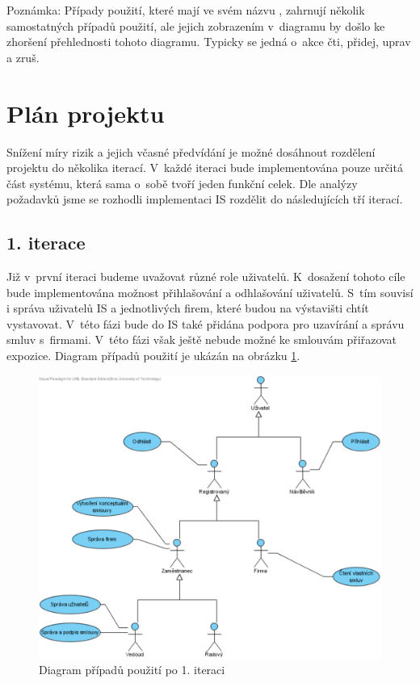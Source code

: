 Poznámka: Případy použití, které mají ve svém názvu , zahrnují
několik samostatných případů použití, ale jejich zobrazením v~diagramu by došlo
ke zhoršení přehlednosti tohoto diagramu. Typicky se jedná o~akce čti, přidej,
uprav a zruš.

\section*{Plán projektu}

Snížení míry rizik a jejich včasné předvídání je možné dosáhnout rozdělení
projektu do několika iterací. V~každé iteraci bude implementována pouze určitá
část systému, která sama o~sobě tvoří jeden funkční celek. Dle analýzy
požadavků jsme se rozhodli implementaci IS rozdělit do následujících tří
iterací.

\subsection*{1. iterace}

Již v~první iteraci budeme uvažovat různé role uživatelů. K~dosažení tohoto
cíle bude implementována možnost přihlašování a odhlašování uživatelů. S~tím
souvisí i správa uživatelů IS a jednotlivých firem, které budou na výstavišti
chtít vystavovat. V~této fázi bude do IS také přidána podpora pro uzavírání a
správu smluv s~firmami. V~této fázi však ještě nebude možné ke smlouvám
přiřazovat expozice. Diagram případů použití je ukázán na obrázku
\ref{fig:UseCaseStage1}.

\begin{figure}[h]
	\begin{center}
		\includegraphics[width=12.5cm,keepaspectratio]{include/use_case_stage1}
	\end{center}
	\caption{Diagram případů použití po 1. iteraci}
	\label{fig:UseCaseStage1}
\end{figure}

